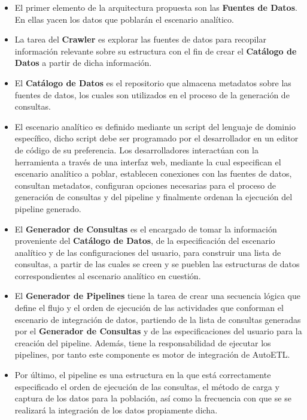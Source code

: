 \begin{itemize}
    \item El primer elemento de la arquitectura propuesta son las \textbf{Fuentes de Datos}. En ellas yacen los 
        datos que poblar\'an el escenario analítico.
    \item La tarea del \textbf{Crawler} es explorar las fuentes de datos para recopilar información relevante sobre su estructura 
        con el fin de crear el \textbf{Catálogo de Datos} a partir de dicha información.
    \item El \textbf{Catálogo de Datos} es el repositorio que almacena metadatos sobre las fuentes de datos, los cuales son 
        utilizados en el proceso de la generación de consultas.
    \item El escenario analítico es definido mediante un script del lenguaje de dominio específico, dicho script debe ser programado por el desarrollador en 
        un editor de código de su preferencia. Los desarrolladores interactúan con la herramienta a través de una interfaz web, mediante la cual especifican el escenario 
        analítico a poblar, establecen conexiones con las fuentes de datos, consultan metadatos, configuran opciones necesarias 
        para el proceso de generación de consultas y del pipeline y finalmente ordenan la ejecución del pipeline generado. 
    \item El \textbf{Generador de Consultas} es el encargado de tomar la información proveniente del \textbf{Catálogo de Datos}, de la especificación
        del escenario analítico y de las configuraciones del usuario, para construir una lista de consultas, a partir de las cuales se creen y se pueblen 
        las estructuras de datos correspondientes al escenario analítico en cuestión.
    \item El \textbf{Generador de Pipelines} tiene la tarea de crear una secuencia lógica que define el flujo y el orden de ejecución de las actividades 
        que conforman el escenario de integración de datos, partiendo 
        de la lista de consultas generadas por el \textbf{Generador de Consultas} y de las especificaciones del usuario para la creación del pipeline. 
        Además, tiene la responsabilidad de ejecutar los pipelines, por tanto este componente es motor de integración de AutoETL.
    \item Por \'ultimo, el pipeline es una estructura en la que est\'a correctamente especificado el orden de ejecución de las consultas, 
        el método de carga y captura de los datos para la población, así como la frecuencia con que se se realizará la integración de los datos propiamente dicha.
\end{itemize}

